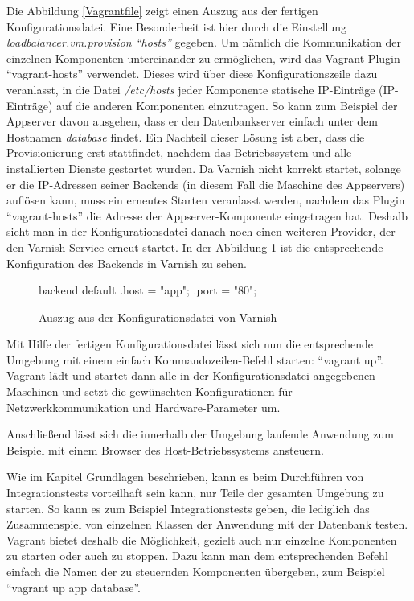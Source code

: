 Die Abbildung \ref{Vagrantfile} zeigt einen Auszug aus der fertigen Konfigurationsdatei. Eine Besonderheit ist hier durch die Einstellung \textit{loadbalancer.vm.provision "`hosts"'} gegeben. Um nämlich die Kommunikation der einzelnen Komponenten untereinander zu ermöglichen, wird das Vagrant-Plugin "`vagrant-hosts"' \citep[Vgl.][]{vagranthosts} verwendet. Dieses wird über diese Konfigurationszeile dazu veranlasst, in die Datei \textit{/etc/hosts} jeder Komponente statische IP-Einträge (\acl{IP}-Einträge) auf die anderen Komponenten einzutragen. So kann zum Beispiel der Appserver davon ausgehen, dass er den Datenbankserver einfach unter dem Hostnamen \textit{database} findet. Ein Nachteil dieser Lösung ist aber, dass die Provisionierung erst stattfindet, nachdem das Betriebssystem und alle installierten Dienste gestartet wurden. Da Varnish nicht korrekt startet, solange er die IP-Adressen seiner Backends (in diesem Fall die Maschine des Appservers) auflösen kann, muss ein erneutes Starten veranlasst werden, nachdem das Plugin "`vagrant-hosts"' die Adresse der Appserver-Komponente eingetragen hat. Deshalb sieht man in der Konfigurationsdatei danach noch einen weiteren Provider, der den Varnish-Service erneut startet. In der Abbildung \ref{varnishconf} ist die entsprechende Konfiguration des Backends in Varnish zu sehen.

\begin{figure}[!ht]
  \begin{center}
    \begin{yamlcode}
backend default {
    .host = "app";
    .port = "80";
}
    \end{yamlcode}
    \caption{Auszug aus der Konfigurationsdatei von Varnish}
    \label{varnishconf}
  \end{center}
\end{figure}

Mit Hilfe der fertigen Konfigurationsdatei lässt sich nun die entsprechende Umgebung mit einem einfach Kommandozeilen-Befehl starten: "`vagrant up"'. Vagrant lädt und startet dann alle in der Konfigurationsdatei angegebenen Maschinen und setzt die gewünschten Konfigurationen für Netzwerkkommunikation und Hardware-Parameter um.

Anschließend lässt sich die innerhalb der Umgebung laufende Anwendung zum Beispiel mit einem Browser des Host-Betriebssystems ansteuern.

Wie im Kapitel Grundlagen beschrieben, kann es beim Durchführen von Integrationstests vorteilhaft sein kann, nur Teile der gesamten Umgebung zu starten. So kann es zum Beispiel Integrationstests geben, die lediglich das Zusammenspiel von einzelnen Klassen der Anwendung mit der Datenbank testen. Vagrant bietet deshalb die Möglichkeit, gezielt auch nur einzelne Komponenten zu starten oder auch zu stoppen. Dazu kann man dem entsprechenden Befehl einfach die Namen der zu steuernden Komponenten übergeben, zum Beispiel "`vagrant up app database"'.

